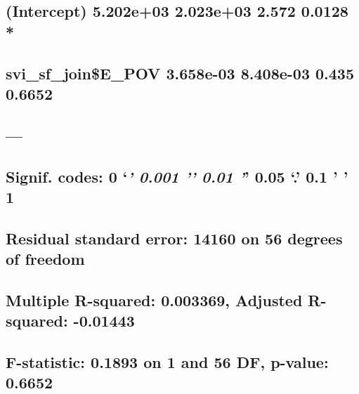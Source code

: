 \documentclass[
  12pt,
]{article}
\begin{document}
\hypertarget{intercept-5.202e03-2.023e03-2.572-0.0128}{%
\subsection{(Intercept) 5.202e+03 2.023e+03 2.572 0.0128
*}\label{intercept-5.202e03-2.023e03-2.572-0.0128}}

\hypertarget{svi_sf_joine_pov-3.658e-03-8.408e-03-0.435-0.6652}{%
\subsection{svi\_sf\_join\$E\_POV 3.658e-03 8.408e-03 0.435
0.6652}\label{svi_sf_joine_pov-3.658e-03-8.408e-03-0.435-0.6652}}

\hypertarget{section-98}{%
\subsection{---}\label{section-98}}

\hypertarget{signif.-codes-0-0.001-0.01-0.05-.-0.1-1-9}{%
\subsection{\texorpdfstring{Signif. codes: 0 `\emph{\textbf{' 0.001 '}'
0.01 '}' 0.05 `.' 0.1 ' '
1}{Signif. codes: 0 `\,' 0.001 '\,' 0.01 '\,' 0.05 `.' 0.1 ' ' 1}}\label{signif.-codes-0-0.001-0.01-0.05-.-0.1-1-9}}

\hypertarget{section-99}{%
\subsection{}\label{section-99}}

\hypertarget{residual-standard-error-14160-on-56-degrees-of-freedom}{%
\subsection{Residual standard error: 14160 on 56 degrees of
freedom}\label{residual-standard-error-14160-on-56-degrees-of-freedom}}

\hypertarget{multiple-r-squared-0.003369-adjusted-r-squared--0.01443}{%
\subsection{Multiple R-squared: 0.003369, Adjusted R-squared:
-0.01443}\label{multiple-r-squared-0.003369-adjusted-r-squared--0.01443}}

\hypertarget{f-statistic-0.1893-on-1-and-56-df-p-value-0.6652}{%
\subsection{F-statistic: 0.1893 on 1 and 56 DF, p-value:
0.6652}\label{f-statistic-0.1893-on-1-and-56-df-p-value-0.6652}}
\end{document}
